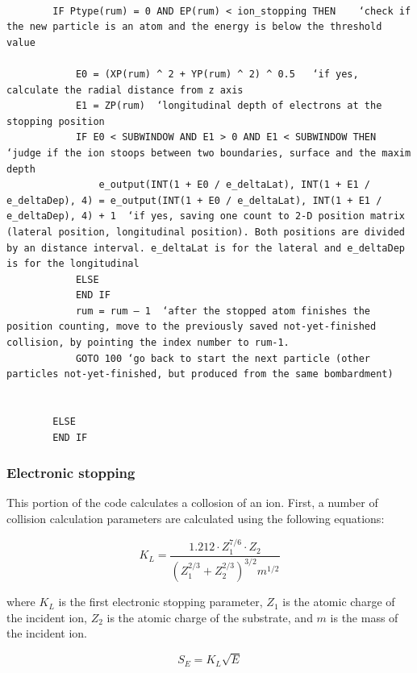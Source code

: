 \documentclass[10pt, reqno]{exam}
\begin{document}
\begin{verbatim}

        IF Ptype(rum) = 0 AND EP(rum) < ion_stopping THEN    ‘check if the new particle is an atom and the energy is below the threshold value
    
            E0 = (XP(rum) ^ 2 + YP(rum) ^ 2) ^ 0.5   ‘if yes, calculate the radial distance from z axis
            E1 = ZP(rum)  ‘longitudinal depth of electrons at the stopping position
            IF E0 < SUBWINDOW AND E1 > 0 AND E1 < SUBWINDOW THEN ‘judge if the ion stoops between two boundaries, surface and the maxim depth
                e_output(INT(1 + E0 / e_deltaLat), INT(1 + E1 / e_deltaDep), 4) = e_output(INT(1 + E0 / e_deltaLat), INT(1 + E1 / e_deltaDep), 4) + 1  ‘if yes, saving one count to 2-D position matrix (lateral position, longitudinal position). Both positions are divided by an distance interval. e_deltaLat is for the lateral and e_deltaDep is for the longitudinal 
            ELSE
            END IF
            rum = rum – 1  ‘after the stopped atom finishes the position counting, move to the previously saved not-yet-finished collision, by pointing the index number to rum-1. 
            GOTO 100 ‘go back to start the next particle (other particles not-yet-finished, but produced from the same bombardment)
    
    
        ELSE
        END IF
\end{verbatim}
\subsubsection{Electronic stopping}

This portion of the code calculates a collosion of an ion. First, a number of collision calculation parameters are calculated using the following equations:

\begin{equation}
    K_L = \frac{1.212\cdot Z_1^{7/6}\cdot Z_2}{(Z_1^{2/3} + Z_2^{2/3})^{3/2}m^{1/2}}
    \label{eq:first electronic stopping parameter}
\end{equation}

where $K_L$ is the first electronic stopping parameter, $Z_1$ is the atomic charge of the incident ion, $Z_2$ is the atomic charge of the substrate, and $m$ is the mass of the incident ion. \par

\begin{equation}
    S_E = K_L \sqrt{E}
\end{equation}
\end{document}
